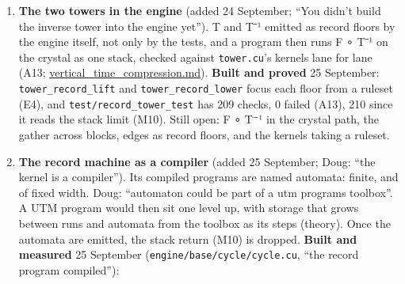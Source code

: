 \begin{enumerate}
\begin{itemize}
\end{itemize}
\item \textbf{The two towers in the engine} (added 24 September; “You didn't build the inverse tower into the engine yet”). T and T⁻¹ emitted as record floors by the engine itself, not only by the tests, and a program then runs F ∘ T⁻¹ on the crystal as one stack, checked against \texttt{tower.\allowbreak{}cu}'s kernels lane for lane (A13; \hyperref[chap:vertical-time-compression]{vertical\_\allowbreak{}time\_\allowbreak{}compression.md}). \textbf{Built and proved} 25 September: \texttt{tower\_\allowbreak{}record\_\allowbreak{}lift} and \texttt{tower\_\allowbreak{}record\_\allowbreak{}lower} focus each floor from a ruleset (E4), and \texttt{test/\allowbreak{}record\_\allowbreak{}tower\_\allowbreak{}test} has 209 checks, 0 failed (A13), 210 since it reads the stack limit (M10). Still open: F ∘ T⁻¹ in the crystal path, the gather across blocks, edges as record floors, and the kernels taking a ruleset.
\item \textbf{The record machine as a compiler} (added 25 September; Doug: “the kernel is a compiler”). Its compiled programs are named automata: finite, and of fixed width. Doug: “automaton could be part of a utm programs toolbox”. A UTM program would then sit one level up, with storage that grows between runs and automata from the toolbox as its steps (theory). Once the automata are emitted, the stack return (M10) is dropped. \textbf{Built and measured} 25 September (\texttt{engine/\allowbreak{}base/\allowbreak{}cycle/\allowbreak{}cycle.\allowbreak{}cu}, “the record program compiled”):


\end{enumerate}
